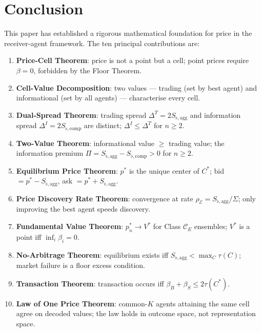 \documentclass[twocolumn,11pt,a4paper]{article}
\theoremstyle{remark}
\newcommand{\tol}{\tau}
\newcommand{\Ens}{\mathcal{E}}
\newcommand{\MidP}{p^*}                  %
\newcommand{\SpreadT}{\Delta^T}          %
\newcommand{\SpreadI}{\Delta^I}          %
\newcommand{\FV}{V^*}                    %
\newcommand{\SflatT}{S_{\flat,\mathrm{agg}}}        %
\newcommand{\SflatI}{S_{\flat,\mathrm{comp}}}       %
\newcommand{\Prem}{\Pi}                  %
\newcommand{\srad}{\rho}               %
\begin{document}
\section{Conclusion}
\label{sec:conclusion}

This paper has established a rigorous mathematical foundation for price in
the receiver-agent framework.  The ten principal contributions are:

\begin{enumerate}[leftmargin=*, label=\textbf{(\roman*)}]
\item \textbf{Price-Cell Theorem}: price is not a point but a cell; point
  prices require $\beta=0$, forbidden by the Floor Theorem.
\item \textbf{Cell-Value Decomposition}: two values — trading (set by best
  agent) and informational (set by all agents) — characterise every cell.
\item \textbf{Dual-Spread Theorem}: trading spread $\SpreadT = 2\SflatT$
  and information spread $\SpreadI = 2\SflatI$ are distinct; $\SpreadI
  \le \SpreadT$ for $n \ge 2$.
\item \textbf{Two-Value Theorem}: informational value $\ge$ trading value;
  the information premium $\Prem = \SflatT - \SflatI > 0$ for $n \ge 2$.
\item \textbf{Equilibrium Price Theorem}: $\MidP$ is the unique center of
  $C^*$; bid $= \MidP - \SflatT$, ask $= \MidP + \SflatT$.
\item \textbf{Price Discovery Rate Theorem}: convergence at rate
  $\srad_\Ens = \SflatT/\Sigma$; only improving the best agent speeds
  discovery.
\item \textbf{Fundamental Value Theorem}: $\MidP_n \to \FV$ for Class
  $\mathcal{C}_E$ ensembles; $\FV$ is a point iff $\inf_i\beta_i = 0$.
\item \textbf{No-Arbitrage Theorem}: equilibrium exists iff $\SflatT <
  \max_C \tol(C)$; market failure is a floor excess condition.
\item \textbf{Transaction Theorem}: transaction occurs iff
  $\beta_B + \beta_S \le 2\tol(C^*)$.
\item \textbf{Law of One Price Theorem}: common-$K$ agents attaining the
  same cell agree on decoded values; the law holds in outcome space, not
  representation space.
\end{enumerate}
\end{document}
